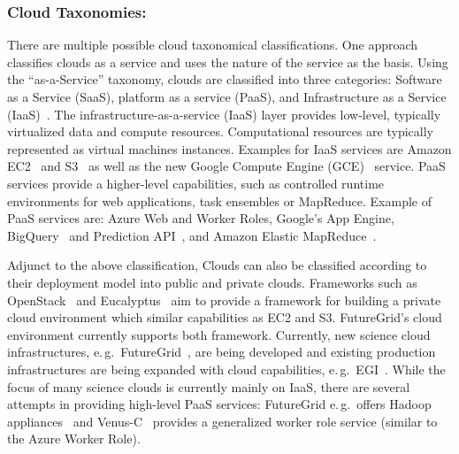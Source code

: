 \documentclass[times]{cpeauth}
\begin{document}
\subsubsection*{Cloud Taxonomies: }
There are multiple possible cloud taxonomical classifications. One
approach classifies clouds as a service and uses the nature of the
service as the basis. Using the ``as-a-Service'' taxonomy, clouds are
classified into three categories: Software as a Service (SaaS),
platform as a service (PaaS), and Infrastructure as a Service
(IaaS)~\cite{Jha:2010kx}. The infrastructure-as-a-service (IaaS) layer
provides low-level, typically virtualized data and compute resources.
Computational resources are typically represented as virtual machines
instances. Examples for IaaS services are Amazon EC2~\cite{amazon_ec2}
and S3~\cite{amazons3} as well as the new Google Compute Engine
(GCE)~\cite{gce} service. PaaS services provide a higher-level
capabilities, such as controlled runtime environments for web
applications, task ensembles or MapReduce.  Example of PaaS services
are: Azure Web and Worker Roles, Google's App Engine,
BigQuery~\cite{google-bigquery} and Prediction
API~\cite{google-predication-api}, and Amazon Elastic
MapReduce~\cite{amazonemr}.


% 



Adjunct to the above classification, Clouds can also be classified
according to their deployment model into public and private
clouds. Frameworks such as OpenStack~\cite{openstack} and
Eucalyptus~\cite{euca} aim to provide a framework for building a
private cloud environment which similar capabilities as EC2 and
S3. FutureGrid's cloud environment currently supports both
framework. Currently, new science cloud infrastructures, e.\,g.\
FutureGrid~\cite{futuregrid}, are being developed and existing
production infrastructures are being expanded with cloud capabilities,
e.\,g.\ EGI~\cite{egi-cloud}. While the focus of many science clouds
is currently mainly on IaaS, there are several attempts in providing
high-level PaaS services: FutureGrid e.\,g.\ offers Hadoop
appliances~\cite{2016793} and Venus-C~\cite{venusc-generic-worker}
provides a generalized worker role service (similar to the Azure
Worker Role).
\end{document}

